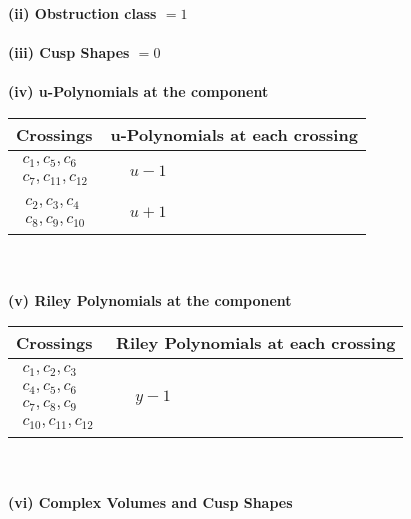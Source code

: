\documentclass[1p]{elsarticle_modified}
\theoremstyle{definition}
\begin{document}
\flushleft \textbf{(ii) Obstruction class $= 1$}\\~\\
\flushleft \textbf{(iii) Cusp Shapes $= 0$}\\~\\
\newpage\renewcommand{\arraystretch}{1}
\flushleft \textbf{(iv) u-Polynomials at the component}\newline \\
\begin{tabular}{m{50pt}|m{274pt}}
Crossings & \hspace{64pt}u-Polynomials at each crossing \\
\hline $$\begin{aligned}c_{1},c_{5},c_{6}\\c_{7},c_{11},c_{12}\end{aligned}$$&$\begin{aligned}
&u-1
\end{aligned}$\\
\hline $$\begin{aligned}c_{2},c_{3},c_{4}\\c_{8},c_{9},c_{10}\end{aligned}$$&$\begin{aligned}
&u+1
\end{aligned}$\\
\hline
\end{tabular}\\~\\
\newpage\renewcommand{\arraystretch}{1}
\flushleft \textbf{(v) Riley Polynomials at the component}\newline \\
\begin{tabular}{m{50pt}|m{274pt}}
Crossings & \hspace{64pt}Riley Polynomials at each crossing \\
\hline $$\begin{aligned}c_{1},c_{2},c_{3}\\c_{4},c_{5},c_{6}\\c_{7},c_{8},c_{9}\\c_{10},c_{11},c_{12}\end{aligned}$$&$\begin{aligned}
&y-1
\end{aligned}$\\
\hline
\end{tabular}\\~\\
\newpage\flushleft \textbf{(vi) Complex Volumes and Cusp Shapes}
\end{document}
